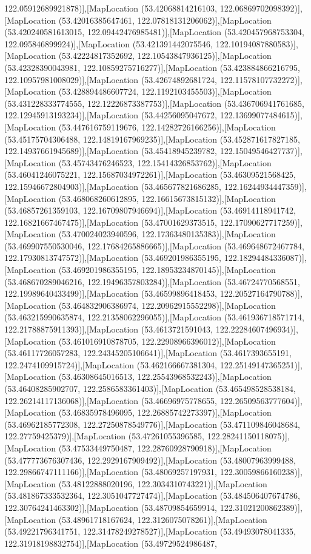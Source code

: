 122.05912689921878)],[MapLocation (53.42068814216103, 122.06869702098392)],[MapLocation (53.42016385647461, 122.07818131206062)],[MapLocation (53.420240581613015, 122.09442476985481)],[MapLocation (53.420457968753304, 122.095846899924)],[MapLocation (53.421391442075546, 122.10194087880583)],[MapLocation (53.42224817352692, 122.10543847936125)],[MapLocation (53.42328390043981, 122.10859275716277)],[MapLocation (53.423884866216795, 122.10957981008029)],[MapLocation (53.42674892681724, 122.11578107732272)],[MapLocation (53.428894486607724, 122.1192103455503)],[MapLocation (53.431228333774555, 122.12226873387753)],[MapLocation (53.436706941761685, 122.12945913193234)],[MapLocation (53.44256095047672, 122.13699077484615)],[MapLocation (53.447616759119676, 122.14282726166256)],[MapLocation (53.45175704306488, 122.14819167969235)],[MapLocation (53.452871617827185, 122.14937661945689)],[MapLocation (53.45418945239782, 122.15049546427737)],[MapLocation (53.45743476246523, 122.15414326853762)],[MapLocation (53.46041246075221, 122.15687034972261)],[MapLocation (53.46309521568425, 122.15946672804903)],[MapLocation (53.465677821686285, 122.16244934447359)],[MapLocation (53.468068260612895, 122.16615673815132)],[MapLocation (53.46857261359103, 122.16709807946694)],[MapLocation (53.46914118941742, 122.16821667467475)],[MapLocation (53.47001629373515, 122.17090627717259)],[MapLocation (53.470024023940596, 122.17363480135383)],[MapLocation (53.469907550530046, 122.17684265886665)],[MapLocation (53.469648672467784, 122.17930813747572)],[MapLocation (53.469201986355195, 122.18294484336087)],[MapLocation (53.469201986355195, 122.18953234870145)],[MapLocation (53.468670289046216, 122.19496357803284)],[MapLocation (53.46724770568551, 122.19989640433499)],[MapLocation (53.46599896418453, 122.20527164790788)],[MapLocation (53.464832906386974, 122.20962915552298)],[MapLocation (53.463215990635874, 122.21358062296055)],[MapLocation (53.461936718571714, 122.21788875911393)],[MapLocation (53.4613721591043, 122.22284607496934)],[MapLocation (53.461016910878705, 122.22908966396012)],[MapLocation (53.46117726057283, 122.24345205106641)],[MapLocation (53.4617393655191, 122.2474109915724)],[MapLocation (53.462166667381304, 122.25149147365251)],[MapLocation (53.46308645016513, 122.25543968532243)],[MapLocation (53.46408285902707, 122.2586583361403)],[MapLocation (53.465498528538184, 122.26214117136068)],[MapLocation (53.46696975778655, 122.26509563777604)],[MapLocation (53.46835978496095, 122.26885742273397)],[MapLocation (53.46962185772308, 122.27250878549776)],[MapLocation (53.471109846048684, 122.27759425379)],[MapLocation (53.47261055396585, 122.28241150118075)],[MapLocation (53.47533449750487, 122.28760928790918)],[MapLocation (53.477773676307436, 122.2929167909492)],[MapLocation (53.48007963999488, 122.29866747111166)],[MapLocation (53.48069257197931, 122.30059866160238)],[MapLocation (53.48122888020196, 122.3034310743221)],[MapLocation (53.481867333532364, 122.3051047727474)],[MapLocation (53.484506407674786, 122.30764241463302)],[MapLocation (53.48709854659914, 122.31021200862389)],[MapLocation (53.48961718167624, 122.3126075078261)],[MapLocation (53.49221796341751, 122.31478249278527)],[MapLocation (53.49493078041335, 122.31918198832754)],[MapLocation (53.49729524986487, 